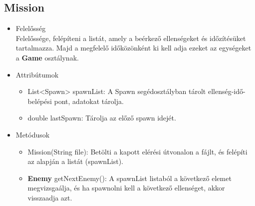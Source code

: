\subsection{Mission}
\begin{itemize}
\item Felelősség\\
Felelőssége, felépíteni a listát, amely a beérkező ellenségeket és időzítésüket tartalmazza. Majd a megfelelő időközönként ki kell adja ezeket az egységeket a \textbf{Game} osztálynak.
\item Attribútumok
	\begin{itemize}
		\item List<Spawn> spawnList: A Spawn segédosztályban tárolt ellenség-idő-belépési pont, adatokat tárolja.
		\item double lastSpawn: Tárolja az előző spawn idejét.
	\end{itemize}
\item Metódusok
	\begin{itemize}
		\item Mission(String file): Betölti a kapott elérési útvonalon a fájlt, és felépíti az alapján a listát (spawnList).
		\item \textbf{Enemy} getNextEnemy(): A spawnList listaból a következő elemet megvizsgaálja, és ha spawnolni kell a következő ellenséget, akkor visszaadja azt.
	\end{itemize}
\end{itemize}


